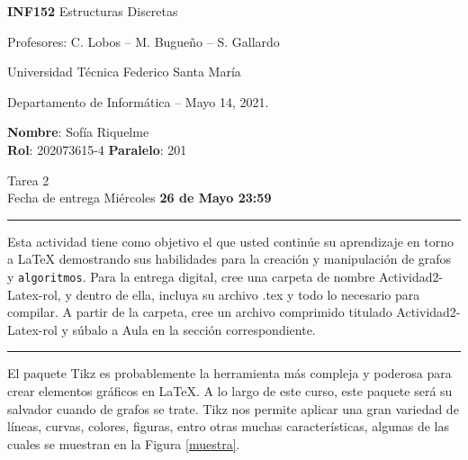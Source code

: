\documentclass[letterpaper,10pt]{article}
\begin{document}
\thispagestyle{empty}

\begin{minipage}[t]{0.6\textwidth}
{\Large \textbf{INF152} Estructuras Discretas}

{\large Profesores: C. Lobos -- M. Bugueño -- S. Gallardo}

Universidad Técnica Federico Santa María

Departamento de Inform\'atica -- Mayo 14, 2021.

\end{minipage}
\hfill
\begin{minipage}[t]{0.35\textwidth}
\textbf{Nombre}: Sofía Riquelme\\[0.3cm]
\textbf{Rol}: 202073615-4 \textbf{Paralelo}: 201
\end{minipage}

\vspace{0.7cm}

\begin{center}
    {\Large Tarea 2} \\ Fecha de entrega Miércoles \textbf{26 de Mayo 23:59}
\end{center}

\hrule 
\vspace{0.2cm}
Esta actividad tiene como objetivo el que usted continúe su aprendizaje en torno a \LaTeX{} demostrando sus habilidades para la creación y manipulación de grafos y \texttt{algoritmos}. Para la entrega digital, cree una carpeta de nombre Actividad2-Latex-rol, y dentro de ella, incluya su archivo .tex y todo lo necesario para compilar. A partir de la carpeta, cree un archivo comprimido titulado Actividad2-Latex-rol y súbalo a Aula en la sección correspondiente.

\vspace{0.2cm}
\hrule 

\vspace{0.4cm} 

\begin{minipage}{0.65\linewidth}
El paquete Tikz es probablemente la herramienta más compleja y poderosa para crear elementos gráficos en \LaTeX. A lo largo de este curso, este paquete será su salvador cuando de grafos se trate. Tikz nos permite aplicar una gran variedad de líneas, curvas, colores, figuras, entro otras muchas características, algunas de las cuales se muestran en la Figura \ref{muestra}.
\end{minipage}
\hfill
\begin{minipage}{0.32\linewidth}
          \centering
        \label{muestra}
\end{minipage}
\end{document}

